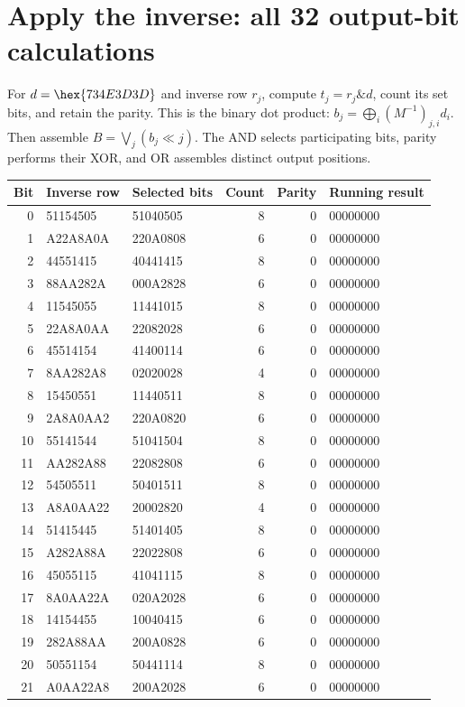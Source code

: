 \section{Apply the inverse: all 32 output-bit calculations}
For $d=\hex{734E3D3D}$ and inverse row $r_j$, compute $t_j=r_j\mathbin{\&}d$, count its set bits, and retain the parity. This is the binary dot product: $b_j=\bigoplus_i(M^{-1})_{j,i}d_i$. Then assemble $B=\bigvee_j(b_j\ll j)$. The AND selects participating bits, parity performs their XOR, and OR assembles distinct output positions.
\begingroup\small
\begin{longtable}{rllrrl}
\toprule
Bit & Inverse row & Selected bits & Count & Parity & Running result\\\midrule
\endhead
0 & 51154505 & 51040505 & 8 & 0 & 00000000\\
1 & A22A8A0A & 220A0808 & 6 & 0 & 00000000\\
2 & 44551415 & 40441415 & 8 & 0 & 00000000\\
3 & 88AA282A & 000A2828 & 6 & 0 & 00000000\\
4 & 11545055 & 11441015 & 8 & 0 & 00000000\\
5 & 22A8A0AA & 22082028 & 6 & 0 & 00000000\\
6 & 45514154 & 41400114 & 6 & 0 & 00000000\\
7 & 8AA282A8 & 02020028 & 4 & 0 & 00000000\\
8 & 15450551 & 11440511 & 8 & 0 & 00000000\\
9 & 2A8A0AA2 & 220A0820 & 6 & 0 & 00000000\\
10 & 55141544 & 51041504 & 8 & 0 & 00000000\\
11 & AA282A88 & 22082808 & 6 & 0 & 00000000\\
12 & 54505511 & 50401511 & 8 & 0 & 00000000\\
13 & A8A0AA22 & 20002820 & 4 & 0 & 00000000\\
14 & 51415445 & 51401405 & 8 & 0 & 00000000\\
15 & A282A88A & 22022808 & 6 & 0 & 00000000\\
16 & 45055115 & 41041115 & 8 & 0 & 00000000\\
17 & 8A0AA22A & 020A2028 & 6 & 0 & 00000000\\
18 & 14154455 & 10040415 & 6 & 0 & 00000000\\
19 & 282A88AA & 200A0828 & 6 & 0 & 00000000\\
20 & 50551154 & 50441114 & 8 & 0 & 00000000\\
21 & A0AA22A8 & 200A2028 & 6 & 0 & 00000000\\

\end{longtable}
